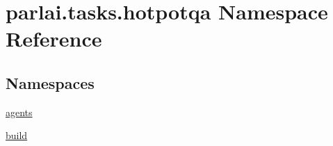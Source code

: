 \hypertarget{namespaceparlai_1_1tasks_1_1hotpotqa}{}\section{parlai.\+tasks.\+hotpotqa Namespace Reference}
\label{namespaceparlai_1_1tasks_1_1hotpotqa}
\subsection*{Namespaces}
\begin{DoxyCompactItemize}
\item 
 \hyperlink{namespaceparlai_1_1tasks_1_1hotpotqa_1_1agents}{agents}
\item 
 \hyperlink{namespaceparlai_1_1tasks_1_1hotpotqa_1_1build}{build}
\end{DoxyCompactItemize}
